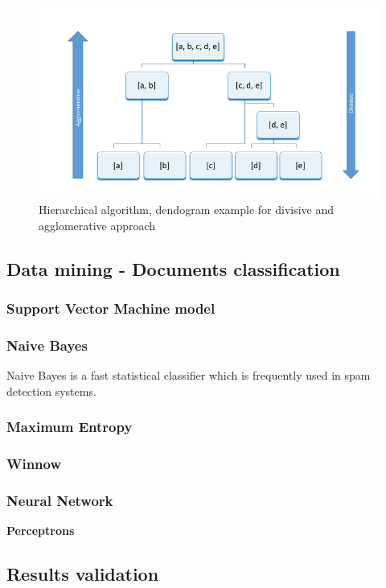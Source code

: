 	\begin{figure}[H]
	\begin{center}
	\includegraphics[width=1.0\linewidth]{images/hierarchical.png}
	\caption{Hierarchical algorithm, dendogram example for divisive and agglomerative approach}
	\label{hierarchical_dendogram}
	\end{center}
	\end{figure}

\subsection{Data mining - Documents classification}
	\subsubsection{Support Vector Machine model}
	\subsubsection{Naive Bayes}
	Naive Bayes is a fast statistical classifier which is frequently used in spam detection systems.
	\subsubsection{Maximum Entropy}
	\subsubsection{Winnow}
	\subsubsection{Neural Network}
	\textbf{Perceptrons}
	
\subsection{Results validation}
